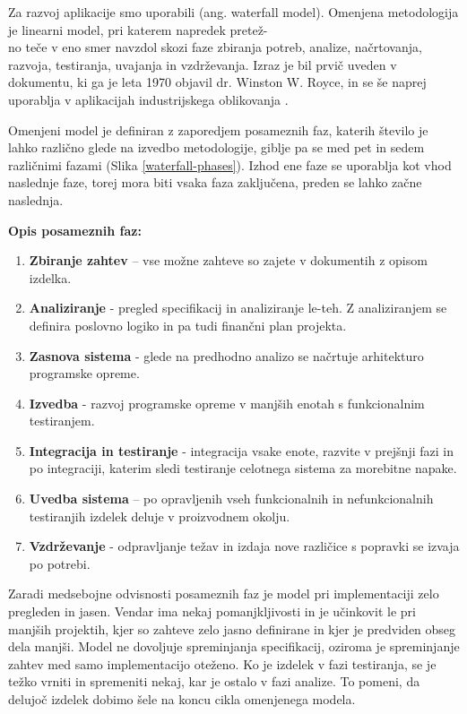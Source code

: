 \documentclass[a4paper, 12pt]{book}
\begin{document}
Za razvoj aplikacije smo uporabili  (ang. waterfall model). Omenjena metodologija je linearni model, pri katerem napredek pretež-\\no teče v eno smer navzdol skozi faze zbiranja potreb, analize, načrtovanja, razvoja, testiranja, uvajanja in vzdrževanja. Izraz je bil prvič uveden v dokumentu, ki ga je leta 1970 objavil dr. Winston W. Royce, in se še naprej uporablja v aplikacijah industrijskega oblikovanja \cite{waterfall-model}.

Omenjeni model je definiran z zaporedjem posameznih faz, katerih število je lahko različno glede na izvedbo metodologije, giblje pa se med pet in sedem različnimi fazami (Slika \ref{waterfall-phases}). Izhod ene faze se uporablja kot vhod naslednje faze, torej mora biti vsaka faza zaključena, preden se lahko začne naslednja.

\begin{description}
\item \textbf{Opis posameznih faz:}
\begin{enumerate}
\item \textbf{Zbiranje zahtev} – vse možne zahteve so zajete v dokumentih z opisom izdelka.
\item \textbf{Analiziranje} - pregled specifikacij in analiziranje le-teh. Z analiziranjem se definira poslovno logiko in pa tudi finančni plan projekta.
\item \textbf{Zasnova sistema} - glede na predhodno analizo se načrtuje arhitekturo programske opreme.
\item \textbf{Izvedba} - razvoj programske opreme v manjših enotah s funkcionalnim testiranjem.
\item \textbf{Integracija in testiranje} - integracija vsake enote, razvite v prejšnji fazi in po integraciji, katerim sledi testiranje celotnega sistema za morebitne napake.
\item \textbf{Uvedba sistema} – po opravljenih vseh funkcionalnih in nefunkcionalnih testiranjih izdelek deluje v proizvodnem okolju.
\item \textbf{Vzdrževanje} - odpravljanje težav in izdaja nove različice s popravki se izvaja po potrebi.
\end{enumerate}
\end{description}

Zaradi medsebojne odvisnosti posameznih faz je model pri implementaciji zelo pregleden in jasen. Vendar ima nekaj pomanjkljivosti in je učinkovit le pri manjših projektih, kjer so zahteve zelo jasno definirane in kjer je predviden obseg dela manjši.
Model ne dovoljuje spreminjanja specifikacij, oziroma je spreminjanje zahtev med samo implementacijo oteženo. Ko je izdelek v fazi testiranja, se je težko vrniti in spremeniti nekaj, kar je ostalo v fazi analize.
To pomeni, da delujoč izdelek dobimo šele na koncu cikla omenjenega modela.
\end{document}
